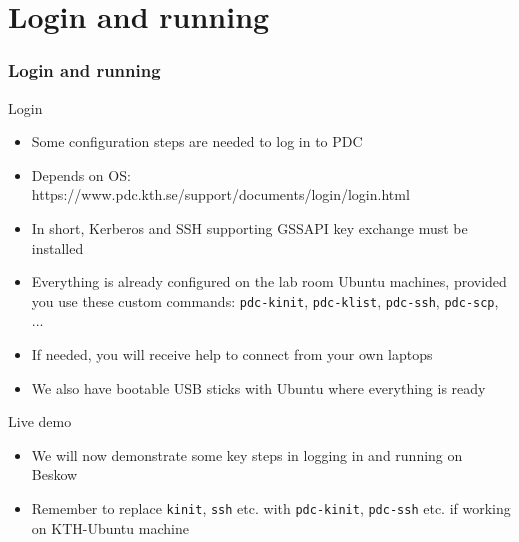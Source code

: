 \section*{Login and running}

\begin{frame}[fragile]
  \frametitle{Login and running}

\footnotesize
\begin{exampleblock}{\large{Login}}
\begin{itemize}
  \item Some configuration steps are needed to log in to PDC 
  \item Depends on OS: https://www.pdc.kth.se/support/documents/login/login.html
  \item In short, Kerberos and SSH supporting GSSAPI key exchange must be installed 
  \item Everything is already configured on the lab room Ubuntu machines, \alert{provided you use these custom commands:} \verb|pdc-kinit|, \verb|pdc-klist|, \verb|pdc-ssh|, \verb|pdc-scp|, ...
  \item If needed, you will receive help to connect from your own laptops
  \item We also have bootable USB sticks with Ubuntu where everything is ready
\end{itemize}
\end{exampleblock}

\begin{exampleblock}{\large{Live demo}}
\begin{itemize}
  \item We will now demonstrate some key steps in logging in and running on Beskow
  \item Remember to replace \verb|kinit|, \verb|ssh| etc. with \verb|pdc-kinit|, \verb|pdc-ssh| etc. if working on KTH-Ubuntu machine
\end{itemize}
\end{exampleblock}

\end{frame}


